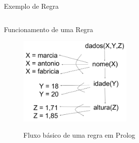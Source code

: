 \documentclass[sans]{beamer}
\begin{document}
\begin{frame}[fragile]
\begin{block}{Exemplo de Regra}

{\scriptsize
\inputminted{Prolog}{prolog/exemplo-01.pl}
}

\end{block}

\end{frame}




\begin{frame}
\begin{block}{Funcionamento de uma Regra}

\begin{figure}[!htb]
\centering
\includegraphics[width=0.5\textwidth , height=0.5\textheight]{figuras/fluxocomposto.pdf}
\label{fig_fluxocomposto}
\caption{Fluxo básico de uma regra em Prolog}
\end{figure}

\end{block}   
\end{frame}
\end{document}
